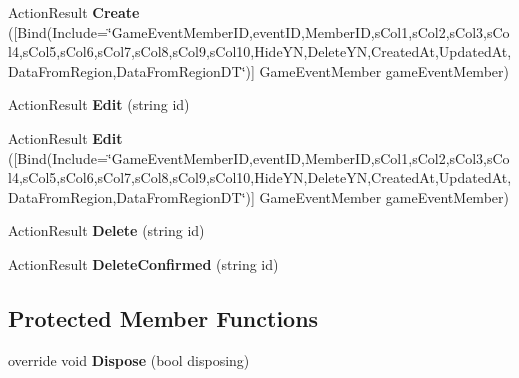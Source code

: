 \begin{DoxyCompactItemize}
\item 
Action\+Result {\bfseries Create} (\mbox{[}Bind(Include=\char`\"{}Game\+Event\+Member\+ID,event\+ID,Member\+ID,s\+Col1,s\+Col2,s\+Col3,s\+Col4,s\+Col5,s\+Col6,s\+Col7,s\+Col8,s\+Col9,s\+Col10,Hide\+YN,Delete\+YN,Created\+At,Updated\+At,Data\+From\+Region,Data\+From\+Region\+DT\char`\"{})\mbox{]} Game\+Event\+Member game\+Event\+Member)\hypertarget{class_cloud_bread_admin_web_1_1_controllers_1_1_game_event_members_controller_ad39bb341cb350076452413c443218774}{}\label{class_cloud_bread_admin_web_1_1_controllers_1_1_game_event_members_controller_ad39bb341cb350076452413c443218774}

\item 
Action\+Result {\bfseries Edit} (string id)\hypertarget{class_cloud_bread_admin_web_1_1_controllers_1_1_game_event_members_controller_a74688f8eb5e8b402269d1cbf74a262f7}{}\label{class_cloud_bread_admin_web_1_1_controllers_1_1_game_event_members_controller_a74688f8eb5e8b402269d1cbf74a262f7}

\item 
Action\+Result {\bfseries Edit} (\mbox{[}Bind(Include=\char`\"{}Game\+Event\+Member\+ID,event\+ID,Member\+ID,s\+Col1,s\+Col2,s\+Col3,s\+Col4,s\+Col5,s\+Col6,s\+Col7,s\+Col8,s\+Col9,s\+Col10,Hide\+YN,Delete\+YN,Created\+At,Updated\+At,Data\+From\+Region,Data\+From\+Region\+DT\char`\"{})\mbox{]} Game\+Event\+Member game\+Event\+Member)\hypertarget{class_cloud_bread_admin_web_1_1_controllers_1_1_game_event_members_controller_abd5ad9ddf90f171847315db51a5ebbca}{}\label{class_cloud_bread_admin_web_1_1_controllers_1_1_game_event_members_controller_abd5ad9ddf90f171847315db51a5ebbca}

\item 
Action\+Result {\bfseries Delete} (string id)\hypertarget{class_cloud_bread_admin_web_1_1_controllers_1_1_game_event_members_controller_a858b7434967d16d0e27f0d6a160d1b58}{}\label{class_cloud_bread_admin_web_1_1_controllers_1_1_game_event_members_controller_a858b7434967d16d0e27f0d6a160d1b58}

\item 
Action\+Result {\bfseries Delete\+Confirmed} (string id)\hypertarget{class_cloud_bread_admin_web_1_1_controllers_1_1_game_event_members_controller_a8753d63a42609dd7a843091871af2066}{}\label{class_cloud_bread_admin_web_1_1_controllers_1_1_game_event_members_controller_a8753d63a42609dd7a843091871af2066}

\end{DoxyCompactItemize}
\subsection*{Protected Member Functions}
\begin{DoxyCompactItemize}
\item 
override void {\bfseries Dispose} (bool disposing)\hypertarget{class_cloud_bread_admin_web_1_1_controllers_1_1_game_event_members_controller_aaccbacff4145e54f1c7a8ec7c5b80629}{}\label{class_cloud_bread_admin_web_1_1_controllers_1_1_game_event_members_controller_aaccbacff4145e54f1c7a8ec7c5b80629}

\end{DoxyCompactItemize}



